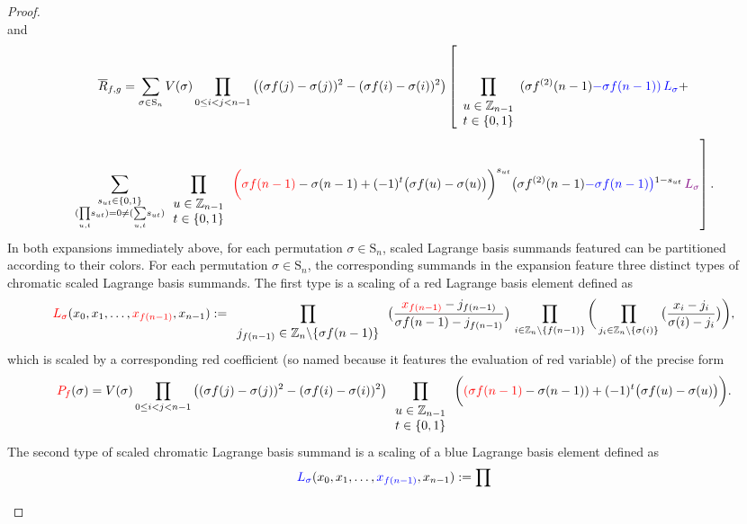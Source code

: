 \begin{proof}
\[\]
and 
\[
\overline{R}_{f,g}=\sum_{\sigma\in\text{S}_{n}}V(\sigma)\prod_{0\le i<j<n-1}\big((\sigma f(j)-\sigma(j))^{2}-(\sigma f(i)-\sigma(i))^{2}\big)\left[\prod_{\begin{array}{c}
u\in\mathbb{Z}_{n-1}\\
t\in\{0,1\}
\end{array}}(\sigma f^{(2)}(n-1){\color{blue}-\sigma f(n-1)}{\color{blue})}\,{\color{blue}L_{\sigma}}+\right.
\]
\[
\left.\sum_{\substack{s_{ut}\in\{0,1\}\\
(\underset{u,t}{\prod}s_{ut})=0\ne(\underset{u,t}{\sum}s_{ut})
}
}\prod_{\begin{array}{c}
u\in\mathbb{Z}_{n-1}\\
t\in\{0,1\}
\end{array}}{\color{red}\bigg(\sigma f(n-1)}-\sigma(n-1)+(-1)^{t}\big(\sigma f(u)-\sigma(u)\big)\bigg)^{s_{ut}}\big(\sigma f^{(2)}(n-1){\color{blue}-\sigma f(n-1)}{\color{blue}\big)}^{1-s_{ut}}\,{\color{violet}L_{\sigma}}\right].
\]
In both expansions immediately above, for each permutation $\sigma\in\text{S}_{n}$, scaled Lagrange basis summands featured can be partitioned according to their colors.
For each permutation $\sigma\in\text{S}_{n}$, the corresponding summands in the expansion feature three distinct types of chromatic scaled Lagrange basis summands. The first type is a scaling of a red Lagrange basis element defined as
\[
{\color{red}L_{\sigma}}(x_{0},x_{1},\ldots,{\color{red}x_{f(n-1)}},x_{n-1}):=\prod_{\begin{array}{c}
j_{f(n-1)}\in\mathbb{Z}_{n}\backslash\{\sigma f(n-1)\}\end{array}}\big(\frac{{\color{red}x_{f(n-1)}}-j_{f(n-1)}}{\sigma f(n-1)-j_{f(n-1)}}\big)\,\prod_{i\in\mathbb{Z}_{n}\backslash\{f(n-1)\}}\bigg(\prod_{j_{i}\in\mathbb{Z}_{n}\backslash\{\sigma(i)\}}\big(\frac{x_{i}-j_{i}}{\sigma(i)-j_{i}}\big)\bigg),
\]
which is scaled by a corresponding red coefficient (so named because it features the evaluation of red variable) of the precise form
\[
{\color{red}P_{f}}(\sigma)=V(\sigma)\prod_{0\le i<j<n-1}\big((\sigma f(j)-\sigma(j))^{2}-(\sigma f(i)-\sigma(i))^{2}\big)\prod_{\begin{array}{c}
u\in\mathbb{Z}_{n-1}\\
t\in\{0,1\}
\end{array}}\bigg({\color{red}(\sigma f(n-1)}-\sigma(n-1))+(-1)^{t}\big(\sigma f(u)-\sigma(u)\big)\bigg).
\]
The second type of scaled chromatic Lagrange basis summand is  a scaling of a blue Lagrange basis element defined as
\[
{\color{blue}L_{\sigma}}(x_{0},x_{1},\ldots,{\color{blue}x_{f(n-1)}},x_{n-1}):=\prod_{\begin{array}{c}

\end{array}}\]
\end{proof}
